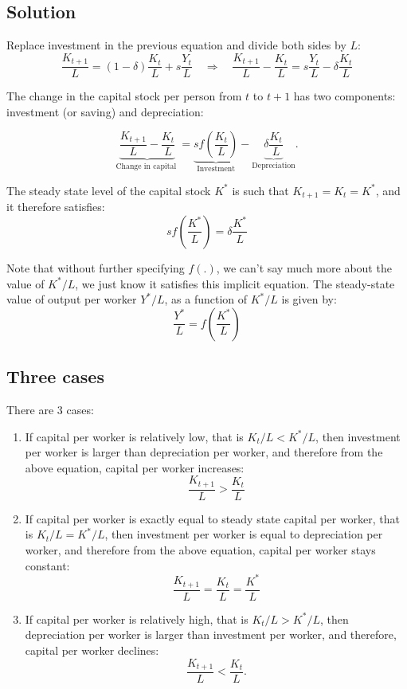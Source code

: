 \documentclass[]{book}
\theoremstyle{definition}
\theoremstyle{definition}
\theoremstyle{definition}
\theoremstyle{remark}
\begin{document}
\subsection{Solution}\label{solution}

Replace investment in the previous equation and divide both sides by
\(L\):
\[\frac{K_{t+1}}{L} =\left(1-\delta\right)\frac{K_{t}}{L}+s\frac{Y_{t}}{L}\quad\Rightarrow\quad\boxed{\frac{K_{t+1}}{L}-\frac{K_{t}}{L}=s\frac{Y_{t}}{L}-\delta\frac{K_{t}}{L}}\]

The change in the capital stock per person from \(t\) to \(t+1\) has two
components: investment (or saving) and depreciation:

\[\underbrace{\frac{K_{t+1}}{L}-\frac{K_{t}}{L}}_{\text{Change in capital }}=\underbrace{sf\left(\frac{K_{t}}{L}\right)}_{\text{Investment}}-\underbrace{\delta\frac{K_{t}}{L}}_{\text{Depreciation}}.\]

The steady state level of the capital stock \(K^{*}\) is such that
\(K_{t+1}=K_{t}=K^{*}\), and it therefore satisfies:
\[\boxed{sf\left(\frac{K^{*}}{L}\right)=\delta\frac{K^{*}}{L}}\]

Note that without further specifying \(f(.)\), we can't say much more
about the value of \(K^{*}/L\), we just know it satisfies this implicit
equation. The steady-state value of output per worker \(Y^{*}/L\), as a
function of \(K^{*}/L\) is given by:
\[\frac{Y^{*}}{L}=f\left(\frac{K^{*}}{L}\right)\]

\subsection{Three cases}\label{three-cases}

There are 3 cases:

\begin{enumerate}
\def\labelenumi{\arabic{enumi}.}
\item
  If capital per worker is relatively low, that is \(K_{t}/L<K^{*}/L\),
  then investment per worker is larger than depreciation per worker, and
  therefore from the above equation, capital per worker increases:
  \[\frac{K_{t+1}}{L}>\frac{K_{t}}{L}\]
\item
  If capital per worker is exactly equal to steady state capital per
  worker, that is \(K_{t}/L=K^{*}/L\), then investment per worker is
  equal to depreciation per worker, and therefore from the above
  equation, capital per worker stays constant:
  \[\frac{K_{t+1}}{L}=\frac{K_{t}}{L}=\frac{K^{*}}{L}\]
\item
  If capital per worker is relatively high, that is \(K_{t}/L>K^{*}/L\),
  then depreciation per worker is larger than investment per worker, and
  therefore, capital per worker declines:
  \[\frac{K_{t+1}}{L}<\frac{K_{t}}{L}.\]
\end{enumerate}
\end{document}
